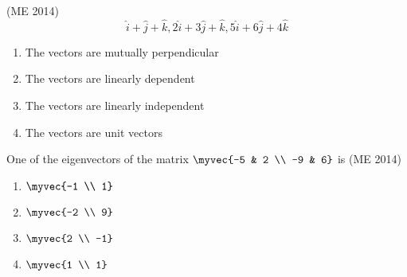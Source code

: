 \hfill{(ME 2014)}
\[
\hat{i} + \hat{j} + \hat{k}, 
 2\hat{i} + 3\hat{j} + \hat{k}, 
 5\hat{i} + 6\hat{j} + 4\hat{k}
\]
\begin{enumerate}
    \item The vectors are mutually perpendicular
    \item The vectors are linearly dependent
    \item The vectors are linearly independent
    \item The vectors are unit vectors
\end{enumerate}
\item One of the eigenvectors of the matrix $\myvec{-5 & 2 \\ -9 & 6}$ is
\hfill{(ME 2014)}
 \begin{multicols}{4}
 \begin{enumerate}
	 \item $\myvec{-1 \\ 1}$
	 \item $\myvec{-2 \\ 9}$
	 \item $\myvec{2 \\ -1}$
	 \item $\myvec{1 \\ 1}$
 \end{enumerate}
 \end{multicols}
